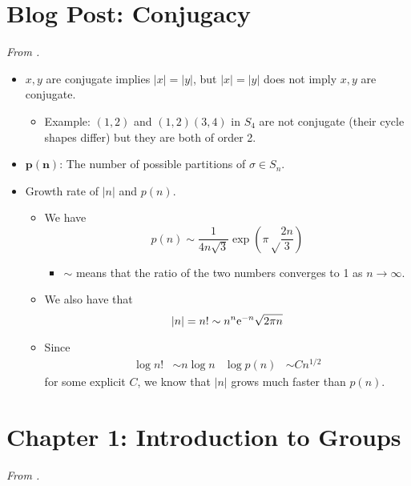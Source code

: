 \documentclass[../notes.tex]{subfiles}
\begin{document}
\section{Blog Post: Conjugacy}
\emph{From \textcite{bib:Calegari}.}
\begin{itemize}
    \item {}$x,y$ are conjugate implies $|x|=|y|$, but $|x|=|y|$ does not imply $x,y$ are conjugate.
    \begin{itemize}
        \item Example: $(1,2)$ and $(1,2)(3,4)$ in $S_4$ are not conjugate (their cycle shapes differ) but they are both of order 2.
    \end{itemize}
    \item $\bm{p(n)}$: The number of possible partitions of $\sigma\in S_n$.
    \item Growth rate of $|n|$ and $p(n)$.
    \begin{itemize}
        \item We have
        \begin{equation*}
            p(n) \sim \frac{1}{4n\sqrt{3}}\exp(\pi\sqrt\frac{2n}{3})
        \end{equation*}
        \begin{itemize}
            \item $\sim$ means that the ratio of the two numbers converges to 1 as $n\to\infty$.
        \end{itemize}
        \item We also have that
        \begin{equation*}
            |n| = n! \sim n^n\e[-n]\sqrt{2\pi n}
        \end{equation*}
        \item Since
        \begin{align*}
            \log n! &\sim n\log n&
            \log p(n) & \sim Cn^{1/2}
        \end{align*}
        for some explicit $C$, we know that $|n|$ grows much faster than $p(n)$.
    \end{itemize}
\end{itemize}



\section{Chapter 1: Introduction to Groups}
\emph{From \textcite{bib:DummitFoote}.}
\end{document}
